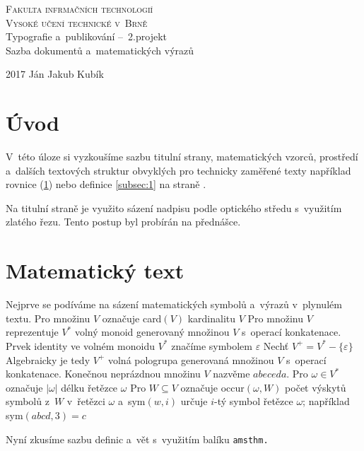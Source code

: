 \documentclass[a4paper, 11pt, times]{article}
\theoremstyle{definition}
\theoremstyle{theorem}
\theoremstyle{remark}
\begin{document}
\begin{center}
  \Huge\textsc{Fakulta infrmačních technologií \\
      Vysoké učení technické v~Brně}\\
  \huge Typografie a~publikování \---\ 2.projekt\\
  Sazba dokumentů a~matematických výrazů
\end{center}

{\LARGE 2017 \hfill Ján Jakub Kubík}
\thispagestyle{empty}
\newpage

\clearpage
\setcounter{page}{1}

\begin{twocolumn}
  
  \section*{Úvod}
   V~této úloze si vyzkoušíme sazbu titulní strany, matematických vzorců,
   prostředí a~dalších textových struktur obvyklých pro technicky
   zaměřené texty například rovnice (\ref{sec:1}) nebo definice \ref{subsec:1} na straně \pageref{first}.
   \par Na titulní straně je využito sázení nadpisu podle optického středu s~využitím
   zlatého řezu. Tento postup byl probírán na přednášce.


  \section{Matematický text}
  \label{sec:1}
  \label{first}
  Nejprve se podíváme na sázení matematických symbolů a~výrazů v~plynulém textu.
   Pro množinu $V$ označuje card$(V)$ kardinalitu $V$
  Pro množinu $V$ reprezentuje $V^*$ volný monoid generovaný množinou $V$
  s~operací konkatenace.
  Prvek identity ve volném monoidu $V^*$ značíme symbolem $\varepsilon$
  Nechť $V^+=V^*-\{\varepsilon\}$ Algebraicky je tedy $V^+$ volná pologrupa
  generovaná množinou $V$ s~operací konkatenace. Konečnou neprázdnou
  množinu $V$ nazvěme $abeceda$. Pro $\omega \in V^*$ označuje $|\omega|$ délku řetězce $\omega$
  Pro $W \subseteq V$ označuje occur$(\omega, W)$ počet výskytů
  symbolů z~$W$ v~řetězci $\omega$ a~sym$(w, i)$ určuje $i$-tý symbol řetězce $\omega$;
  například sym$(abcd, 3)=c$

  Nyní zkusíme sazbu definic a~vět s~využitím balíku
  \texttt{amsthm.}



\end{twocolumn}
\end{document}
